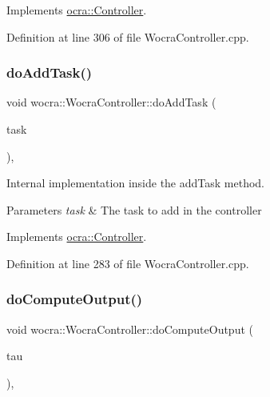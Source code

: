 Implements \hyperlink{classocra_1_1Controller_acb11edc1ceaa89423c1e58f9cb38a9f7}{ocra\+::\+Controller}.



Definition at line 306 of file Wocra\+Controller.\+cpp.

\hypertarget{classwocra_1_1WocraController_aa9a681aa5c0f043638d4d2956c2913c1}{}\label{classwocra_1_1WocraController_aa9a681aa5c0f043638d4d2956c2913c1} 
\subsubsection{\texorpdfstring{do\+Add\+Task()}{doAddTask()}}
{\footnotesize\ttfamily void wocra\+::\+Wocra\+Controller\+::do\+Add\+Task (\begin{DoxyParamCaption}\item[{std\+::shared\+\_\+ptr$<$ \hyperlink{classocra_1_1Task}{Task} $>$}]{task }\end{DoxyParamCaption})\hspace{0.3cm}{\ttfamily [protected]}, {\ttfamily [virtual]}}

Internal implementation inside the add\+Task method.


\begin{DoxyParams}{Parameters}
{\em task} & The task to add in the controller \\
\hline
\end{DoxyParams}


Implements \hyperlink{classocra_1_1Controller_ab3477822a9363553c99eefa58ff803eb}{ocra\+::\+Controller}.



Definition at line 283 of file Wocra\+Controller.\+cpp.

\hypertarget{classwocra_1_1WocraController_aaf750c45d062220e3f78ccb1c8a41d07}{}\label{classwocra_1_1WocraController_aaf750c45d062220e3f78ccb1c8a41d07} 
\subsubsection{\texorpdfstring{do\+Compute\+Output()}{doComputeOutput()}}
{\footnotesize\ttfamily void wocra\+::\+Wocra\+Controller\+::do\+Compute\+Output (\begin{DoxyParamCaption}\item[{Eigen\+::\+Vector\+Xd \&}]{tau }\end{DoxyParamCaption})\hspace{0.3cm}{\ttfamily [protected]}, {\ttfamily [virtual]}}

